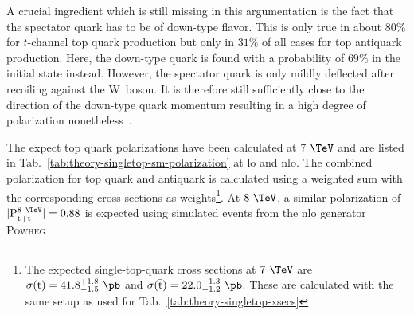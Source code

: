A crucial ingredient which is still missing in this argumentation is the fact that the spectator quark has to be of down-type flavor. This is only true in about $80\%$ for $t$-channel top quark production but only in $31\%$ of all cases for top antiquark production. Here, the down-type quark is found with a probability of $69\%$ in the initial state instead. However, the spectator quark is only mildly deflected after recoiling against the $\mathrm{W}$~boson. It is therefore still sufficiently close to the direction of the down-type quark momentum resulting in a high degree of polarization nonetheless~\cite{Bernreuther:2008ju}.

The expect top quark polarizations have been calculated at $7~\TeV$ and are listed in Tab.~\ref{tab:theory-singletop-sm-polarization} at \gls{lo} and \gls{nlo}. The combined polarization for top quark and antiquark is calculated using a weighted sum with the corresponding cross sections as weights\footnote{The expected single-top-quark cross sections at $7~\TeV$ are $\sigma(\mathrm{t})=41.8^{+1.8}_{-1.5}~\pb$ and $\sigma(\bar{\mathrm{t}})=22.0^{+1.3}_{-1.2}~\pb$. These are calculated with the same setup as used for Tab.~\ref{tab:theory-singletop-xsecs}}. At $8~\TeV$, a similar polarization of $|\mathrm{P}_{\mathrm{t}+\bar{\mathrm{t}}}^\mathrm{8~\TeV}|=0.88$ is expected using simulated events from the \gls{nlo} generator \textsc{Powheg}~\cite{Khachatryan:2015dzz}.


